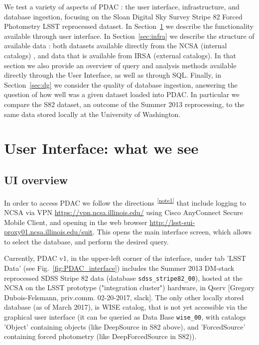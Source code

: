 \documentclass[DM,lsstdraft,toc,usenatbib]{lsstdoc}
\begin{document}
We test a variety of aspects of PDAC : the user interface, infrastructure, and database ingestion, focusing on the Sloan Digital Sky Survey Stripe 82 Forced Photometry LSST reprocessed dataset. In Section~\ref{sec:ui} we describe the functionality available through user interface. In Section~\ref{sec:infra} we describe the structure of  available data : both datasets available directly from the NCSA (internal catalogs) , and data that is available from IRSA (external catalogs).  In that section we also provide an overview of query and analysis methods available directly through the User Interface,  as well as through SQL.  Finally, in Section~\ref{sec:dg} we consider the quality of database ingestion, answering the question of how well was a given dataset loaded into PDAC. In particular we compare the S82 dataset, an outcome of the Summer 2013 reprocessing, to the same data stored locally at the University of Washington. 



\section{User Interface: what we see}
\label{sec:ui}
\subsection{UI overview}

In order to access PDAC we 	follow the directions\textsuperscript{~\ref{note1}} that include logging to NCSA via VPN \url{https://vpn.ncsa.illinois.edu/} using Cisco AnyConnect Secure Mobile Client, and opening in the web browser \url{http://lsst-sui-proxy01.ncsa.illinois.edu/suit}. This opens the main interface screen, which allows to select the database, and perform the desired query. 

Currently, PDAC v1,  in the upper-left corner of the interface, under tab 'LSST Data' (see Fig.~\ref{fig:PDAC_interface}) includes the Summer 2013 DM-stack reprocessed SDSS Stripe 82 data (database \verb|sdss_stripe82_00|), hosted at the NCSA on the LSST prototype ("integration cluster") hardware, in Qserv [Gregory Dubois-Felsmann, priv.comm. 02-20-2017, slack].  The only other locally stored database (as of March 2017), is  WISE catalog, that is not yet accessible via the graphical user interface (it can be queried as Data Base \verb|wise_00|, with catalogs 'Object' containing objects (like DeepSource in S82 above), and 'ForcedSource' containing forced photometry (like DeepForcedSource in S82)). 
\end{document}
